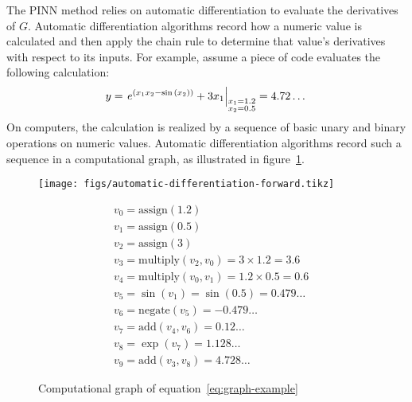 The PINN method relies on automatic differentiation to evaluate the derivatives of $G$.
Automatic differentiation algorithms record how a numeric value is calculated and then apply the chain rule to determine that value's derivatives with respect to its inputs.
For example, assume a piece of code evaluates the following calculation:
\begin{equation}\label{eq:graph-example}
 y = \left.{e^{\left(x_1x_2-\sin{\left(x_2\right)}\right)}+3x_1}\right|_{\begin{subarray}{l}x_1=1.2 \\ x_2=0.5\end{subarray}} = 4.72\dots
\end{equation}
On computers, the calculation is realized by a sequence of basic unary and binary operations on numeric values.
Automatic differentiation algorithms record such a sequence in a computational graph, as illustrated in figure~\ref{fig:automatic-differentiation-forward}.
\begin{figure}[hbt!]
    \Centering
    \begin{minipage}[c]{0.4\textwidth}
        \texttt{[image: figs/automatic-differentiation-forward.tikz]}
    \end{minipage}%
    \begin{minipage}[c]{0.5\textwidth}
        \scriptsize
        \singlespacing
        \begin{equation*}
            \begin{aligned}
                &v_0 = \mathrm{assign}\left(1.2\right) \\
                &v_1 = \mathrm{assign}\left(0.5\right) \\
                &v_2 = \mathrm{assign}\left(3\right) \\
                &v_3 = \mathrm{multiply}\left(v_2, v_0\right)  = 3 \times 1.2 = 3.6 \\
                &v_4 = \mathrm{multiply}\left(v_0, v_1\right) = 1.2 \times 0.5 = 0.6 \\
                &v_5 = \sin\left({v_1}\right) = \sin\left(0.5\right) = 0.479\dots \\
                &v_6 = \mathrm{negate}\left(v_5\right) = -0.479\dots \\
                &v_7 = \mathrm{add}\left(v_4, v_6\right) = 0.12\dots \\
                &v_8 = \exp\left({v_7}\right) = 1.128\dots \\
                &v_9 = \mathrm{add}\left(v_3, v_8\right) = 4.728\dots
            \end{aligned}
        \end{equation*}
    \end{minipage}
    \caption{Computational graph of equation~\ref{eq:graph-example}}%
    \label{fig:automatic-differentiation-forward}
\end{figure}

